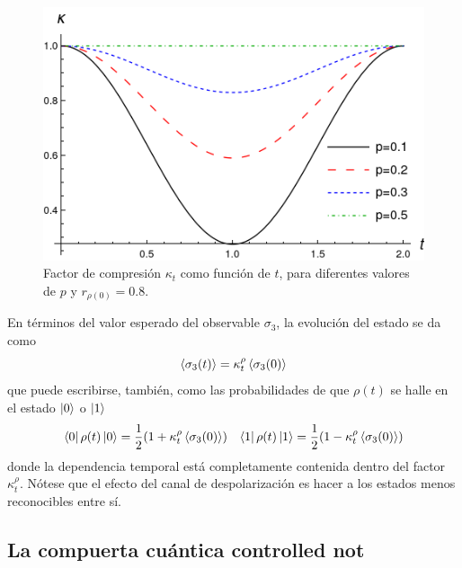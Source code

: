 \begin{figure}[h!]
  \centering
  \includegraphics[width=0.6\linewidth]{chapter3/figures_toy/ContractionFactorSWAP_z=0.8_t=0_to_t=2.png}
  \caption{Factor de compresión $\kappa_{t}$ como función de $t$, para diferentes valores de $p$ y $r_{\rho(0)}=0.8$.}
  \label{fig:SWAPFactor2Dt}
\end{figure}

En términos del valor esperado del observable $\sigma_{3}$, la evolución del estado se da como
\begin{equation}
  \expval{\sigma_{3}(t)}=\kappa_{t}^{\rho}\expval{\sigma_{3}(0)}
\end{equation}
que puede escribirse, también, como las probabilidades de que $\rho(t)$ se halle en el estado $\ket{0}$ o $\ket{1}$
 \begin{align}
  \bra{0}\rho(t)\ket{0}=\frac{1}{2}(1+\kappa_{t}^{\rho}\expval{\sigma_{3}(0)}) && \bra{1}\rho(t)\ket{1}=\frac{1}{2}(1-\kappa_{t}^{\rho}\expval{\sigma_{3}(0)})
 \end{align}
 donde la dependencia temporal está completamente contenida dentro del factor $\kappa_{t}^{\rho}$. Nótese que el efecto del canal de despolarización es hacer a los estados menos reconocibles entre sí.


\subsection{La compuerta cuántica controlled not}

